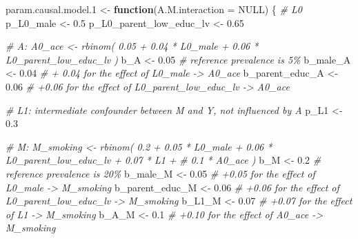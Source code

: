 \documentclass[
]{book}
\newenvironment{Shaded}{\begin{snugshade}}{\end{snugshade}}
\newcommand{\AttributeTok}[1]{\textcolor[rgb]{0.13,0.29,0.53}{#1}}
\newcommand{\CommentTok}[1]{\textcolor[rgb]{0.56,0.35,0.01}{\textit{#1}}}
\newcommand{\ConstantTok}[1]{\textcolor[rgb]{0.56,0.35,0.01}{#1}}
\newcommand{\ControlFlowTok}[1]{\textcolor[rgb]{0.13,0.29,0.53}{\textbf{#1}}}
\newcommand{\FloatTok}[1]{\textcolor[rgb]{0.00,0.00,0.81}{#1}}
\newcommand{\NormalTok}[1]{#1}
\newcommand{\OtherTok}[1]{\textcolor[rgb]{0.56,0.35,0.01}{#1}}
\begin{document}
\begin{Shaded}
\begin{Highlighting}[]
\NormalTok{param.causal.model}\FloatTok{.1} \OtherTok{\textless{}{-}} \ControlFlowTok{function}\NormalTok{(}\AttributeTok{A.M.interaction =} \ConstantTok{NULL}\NormalTok{) \{}
\CommentTok{\# L0}
\NormalTok{p\_L0\_male }\OtherTok{\textless{}{-}} \FloatTok{0.5}
\NormalTok{p\_L0\_parent\_low\_educ\_lv }\OtherTok{\textless{}{-}} \FloatTok{0.65}

\CommentTok{\# A: A0\_ace \textless{}{-} rbinom( 0.05 + 0.04 * L0\_male + 0.06 * L0\_parent\_low\_educ\_lv ) }
\NormalTok{b\_A }\OtherTok{\textless{}{-}} \FloatTok{0.05}   \CommentTok{\# reference prevalence is 5\%}
\NormalTok{b\_male\_A }\OtherTok{\textless{}{-}} \FloatTok{0.04}  \CommentTok{\# + 0.04 for the effect of L0\_male {-}\textgreater{} A0\_ace}
\NormalTok{b\_parent\_educ\_A }\OtherTok{\textless{}{-}} \FloatTok{0.06}  \CommentTok{\# +0.06 for the effect of L0\_parent\_low\_educ\_lv {-}\textgreater{} A0\_ace}

\CommentTok{\# L1: intermediate confounder between M and Y, not influenced by A}
\NormalTok{p\_L1 }\OtherTok{\textless{}{-}} \FloatTok{0.3}

\CommentTok{\# M: M\_smoking \textless{}{-} rbinom( 0.2 + 0.05 * L0\_male + 0.06 * L0\_parent\_low\_educ\_lv + 0.07 * L1 +}
\CommentTok{\#                         0.1 * A0\_ace ) }
\NormalTok{b\_M }\OtherTok{\textless{}{-}} \FloatTok{0.2} \CommentTok{\# reference prevalence is 20\%}
\NormalTok{b\_male\_M }\OtherTok{\textless{}{-}} \FloatTok{0.05} \CommentTok{\# +0.05 for the effect of L0\_male {-}\textgreater{} M\_smoking}
\NormalTok{b\_parent\_educ\_M }\OtherTok{\textless{}{-}} \FloatTok{0.06} \CommentTok{\# +0.06 for the effect of L0\_parent\_low\_educ\_lv {-}\textgreater{} M\_smoking}
\NormalTok{b\_L1\_M }\OtherTok{\textless{}{-}} \FloatTok{0.07} \CommentTok{\# +0.07 for the effect of L1 {-}\textgreater{} M\_smoking}
\NormalTok{b\_A\_M }\OtherTok{\textless{}{-}} \FloatTok{0.1} \CommentTok{\# +0.10 for the effect of A0\_ace {-}\textgreater{} M\_smoking}


\end{Highlighting}
\end{Shaded}
\end{document}

